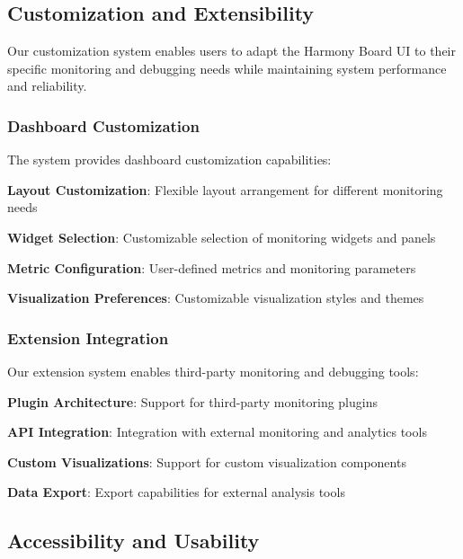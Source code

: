 \subsection*{Customization and Extensibility}

Our customization system enables users to adapt the Harmony Board UI to their specific monitoring and debugging needs while maintaining system performance and reliability.

\subsubsection*{Dashboard Customization}

The system provides dashboard customization capabilities:

\begin{compactlist}
    \item \textbf{Layout Customization}: Flexible layout arrangement for different monitoring needs
    \item \textbf{Widget Selection}: Customizable selection of monitoring widgets and panels
    \item \textbf{Metric Configuration}: User-defined metrics and monitoring parameters
    \item \textbf{Visualization Preferences}: Customizable visualization styles and themes
\end{compactlist}

\subsubsection*{Extension Integration}

Our extension system enables third-party monitoring and debugging tools:

\begin{compactlist}
    \item \textbf{Plugin Architecture}: Support for third-party monitoring plugins
    \item \textbf{API Integration}: Integration with external monitoring and analytics tools
    \item \textbf{Custom Visualizations}: Support for custom visualization components
    \item \textbf{Data Export}: Export capabilities for external analysis tools
\end{compactlist}

\subsection*{Accessibility and Usability}

